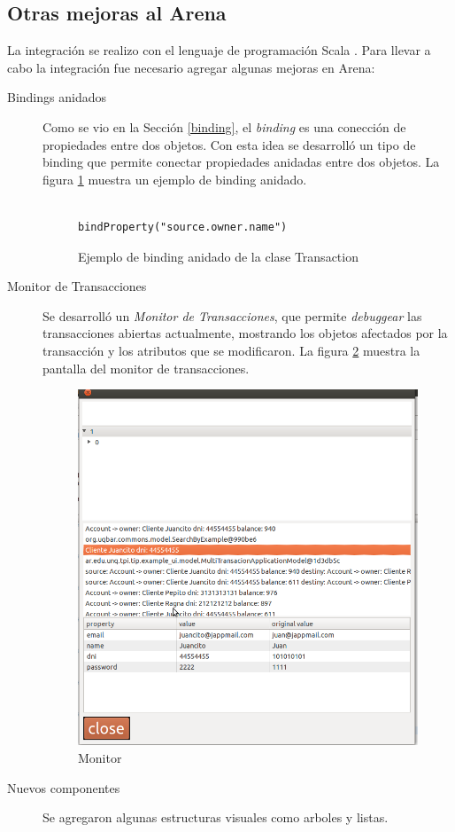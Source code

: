 \subsection{Otras mejoras al Arena}
	La integración se realizo con el lenguaje de programación Scala
	\cite{OderskySpoonVenners08}. Para llevar a cabo la integración fue necesario agregar algunas
	mejoras en Arena:
	\begin{description}

	  \item[Bindings anidados] Como se vio en la Sección \ref{binding},
		  el \emph{binding} es una conección de propiedades entre dos objetos. Con
		  esta idea se desarrolló un tipo de binding que permite conectar propiedades
		  anidadas entre dos objetos. La figura \ref{bindAnidado} muestra un ejemplo de binding anidado.

			\begin{figure}[h]
			\centering
					\begin{lstlisting}
						bindProperty("source.owner.name") 
					\end{lstlisting}
			\caption{Ejemplo de binding anidado de la clase Transaction}
			\label{bindAnidado}
		\end{figure}	

	  \item[Monitor de Transacciones]
		 Se desarrolló un \emph{Monitor de Transacciones}, que permite
		 \emph{debuggear} las transacciones abiertas actualmente, mostrando
		 los objetos afectados por la transacción y los atributos que se
		 modificaron.
		La figura \ref{monitor} muestra la pantalla del monitor de transacciones.
		
		\begin{figure}[h]
			\centering
			\includegraphics[scale=0.5]{img/monitorTransacciones.png}
			\caption{Monitor}
			\label{monitor}
		\end{figure}	
	
	  \item[Nuevos componentes] Se agregaron algunas estructuras visuales como
	  arboles y listas.
	\end{description}
